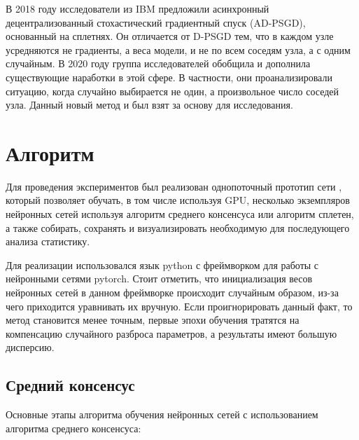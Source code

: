 \documentclass[a4paper,article,14pt]{extarticle}
\begin{document}
В 2018 году исследователи из IBM предложили \cite{o11} асинхронный децентрализованный стохастический градиентный спуск (AD-PSGD), основанный на сплетнях. Он отличается от D-PSGD тем, что в каждом узле усредняются не градиенты, а веса модели, и не по всем соседям узла, а с одним случайным. В 2020 году группа исследователей \cite{decentralized_sgd} обобщила и дополнила существующие наработки в этой сфере. В частности, они проанализировали ситуацию, когда случайно выбирается не один, а произвольное число соседей узла. Данный новый метод и был взят за основу для исследования.


\pagebreak
\section{Алгоритм}
Для проведения экспериментов был реализован однопоточный прототип сети \cite{github}, который позволяет обучать, в том числе используя GPU, несколько экземпляров нейронных сетей используя алгоритм среднего консенсуса или алгоритм сплетен, а также собирать, сохранять и визуализировать необходимую для последующего анализа статистику.

Для реализации использовался язык python с фреймворком для работы с нейронными сетями pytorch. Стоит отметить, что инициализация весов нейронных сетей в данном фреймворке происходит случайным образом, из-за чего приходится уравнивать их вручную. Если проигнорировать данный факт, то метод становится менее точным, первые эпохи обучения тратятся на компенсацию случайного разброса параметров, а результаты имеют большую дисперсию.
\subsection{Средний консенсус}
Основные этапы алгоритма обучения нейронных сетей с использованием алгоритма среднего консенсуса:
\end{document}
